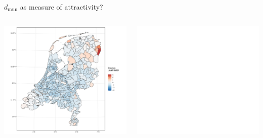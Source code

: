 \documentclass{beamer}
\begin{document}
\begin{frame}{$d_{\text{mun}}$ as measure of attractivity?}
		\begin{columns}
	\begin{column}{0.5\textwidth}
		\begin{center}
			\includegraphics[width=1.1\textwidth]{../fig/p_coef_out}      
		\end{center}
	\end{column}\pause
	\begin{column}{0.5\textwidth} 	
		\begin{center}
			\includegraphics[width=1.1\textwidth]{../fig/p_coef_in}      
		\end{center}
	\end{column}
\end{columns}
\end{frame}
\end{document}
